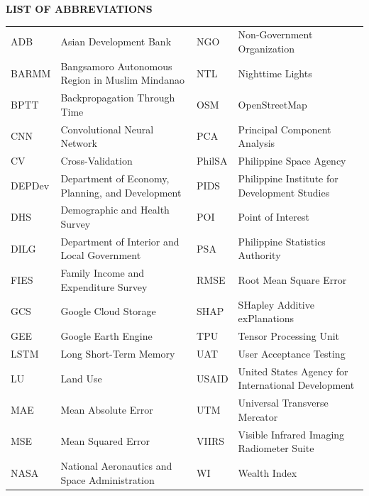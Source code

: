 \documentclass[12pt, letterpaper]{article}
\numberwithin{figure}{section}
\numberwithin{table}{section}
\begin{document}
\cleardoublepage
{}
\listoftables

\cleardoublepage
{}

\begin{center}
  \MakeUppercase{\bfseries List of Abbreviations}
\end{center}
\vspace{0.5cm}

\begin{flushleft}
  \noindent
  \begin{tabularx}{\textwidth}{@{}l >{\raggedright\arraybackslash}X l
    >{\raggedright\arraybackslash}X@{}}
    ADB & Asian Development Bank & NGO & Non-Government Organization \\
    BARMM & Bangsamoro Autonomous Region in Muslim Mindanao & NTL &
    Nighttime Lights \\
    BPTT & Backpropagation Through Time & OSM & OpenStreetMap \\
    CNN & Convolutional Neural Network & PCA & Principal Component Analysis \\
    CV & Cross-Validation & PhilSA & Philippine Space Agency \\
    DEPDev & Department of Economy, Planning, and Development & PIDS
    & Philippine Institute for Development Studies \\
    DHS & Demographic and Health Survey & POI & Point of Interest \\
    DILG & Department of Interior and Local Government & PSA &
    Philippine Statistics Authority \\
    FIES & Family Income and Expenditure Survey & RMSE & Root Mean
    Square Error \\
    GCS & Google Cloud Storage & SHAP & SHapley Additive exPlanations \\
    GEE & Google Earth Engine & TPU & Tensor Processing Unit \\
    LSTM & Long Short-Term Memory & UAT & User Acceptance Testing \\
    LU & Land Use & USAID & United States Agency for International
    Development \\
    MAE & Mean Absolute Error & UTM & Universal Transverse Mercator \\
    MSE & Mean Squared Error & VIIRS & Visible Infrared Imaging
    Radiometer Suite \\
    NASA & National Aeronautics and Space Administration & WI & Wealth Index \\
  \end{tabularx}
\end{flushleft}
\newpage
\end{document}
